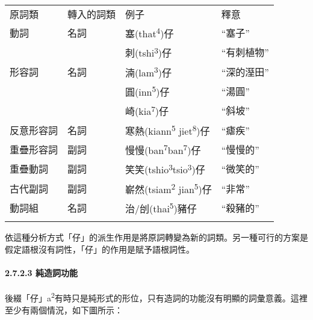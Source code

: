 \tabletail{}
\tablelasttail{}
\begin{tabularx}{\textwidth}{XXXX}
\lsptoprule

 原詞類 & 轉入的詞類 & 例子 & 釋意\\
動詞 & 名詞 & {\sffamily \textrm{塞(that}\textrm{\textsuperscript{4}}\textrm{)仔}} & ``塞子''\\
\hhline{~~--} &  & {\sffamily \textrm{刺(tshi}\textrm{\textsuperscript{3}}\textrm{)仔}} & ``有刺植物''\\
形容詞 & 名詞 & {\sffamily \textrm{湳(lam}\textrm{\textsuperscript{3}}\textrm{)仔}} & ``深的溼田''\\
\hhline{~~--} &  & {\sffamily \textrm{圓(inn}\textrm{\textsuperscript{5}}\textrm{)仔}} & ``湯圓''\\
\hhline{~~--} &  & {\sffamily \textrm{崎(kia}\textrm{\textsuperscript{7}}\textrm{)仔}} & ``斜坡''\\
反意形容詞 & 名詞 & {\sffamily \textrm{寒熱(kiann}\textrm{\textsuperscript{5}} \textrm{jiet}\textrm{\textsuperscript{8}}\textrm{)仔}} & ``瘧疾''\\
重疊形容詞 & 副詞 & {\sffamily \textrm{慢慢(ban}\textrm{\textsuperscript{7}}\textrm{ban}\textrm{\textsuperscript{7}}\textrm{)仔}} & ``慢慢的''\\
重疊動詞 & 副詞 & {\sffamily \textrm{笑笑(tshio}\textrm{\textsuperscript{3}}\textrm{tsio}\textrm{\textsuperscript{3}}\textrm{)仔}} & ``微笑的''\\
古代副詞 & 副詞 & {\sffamily \textrm{嶄然(tsiam}\textrm{\textsuperscript{2}} \textrm{jian}\textrm{\textsuperscript{5}}\textrm{)仔}} & ``非常''\\
動詞組 & 名詞 & {\sffamily \textrm{治/刣(thai}\textrm{\textsuperscript{5}}\textrm{)豬仔}} & ``殺豬的''\\
\lspbottomrule
\end{tabularx}
\textrm{依這種分析方式「仔」的派生作用是將原詞轉變為新的詞類。另一種可行的方案是假定語根沒有詞性，「仔」的作用是賦予語根詞性。}

\paragraph{2.7.2.3 純造詞功能}

\textrm{後綴「仔」a}\textrm{\textsuperscript{2}}\textrm{有時只是純形式的形位，只有造詞的功能沒有明顯的詞彙意義。這裡至少有兩個情況，如下圖所示：}

\tablefirsthead{}

